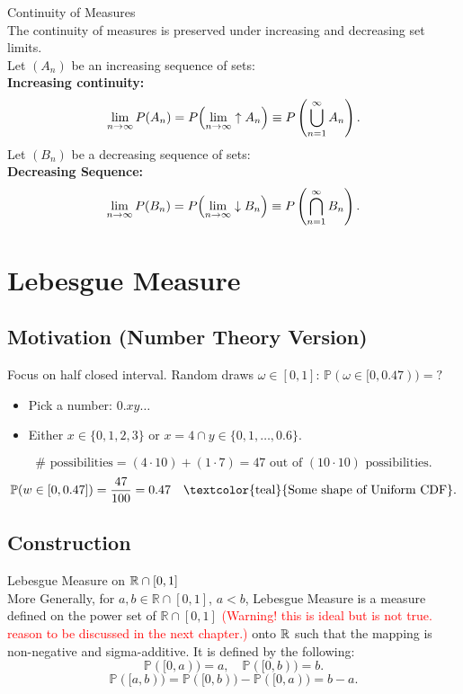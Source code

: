 \begin{prop}{Continuity of Measures}\\
The continuity of measures is preserved under increasing and decreasing set limits. \\

\noindent Let \((A_n)\) be an increasing sequence of sets:\\
\textbf{Increasing continuity:}
    \[
    \lim_{n \to \infty} P(A_n) = P\qty(\lim_{n \to \infty} \uparrow A_n) \equiv P\left(\bigcup_{n=1}^\infty A_n\right).
    \]
 Let \((B_n)\) be a decreasing sequence of sets:\\
 \textbf{Decreasing Sequence:}
    \[
    \lim_{n \to \infty} P(B_n) = P\qty(\lim_{n \to \infty} \downarrow B_n) \equiv P\left(\bigcap_{n=1}^\infty B_n\right).
    \]
\end{prop}

\newpage
\section{Lebesgue Measure}
\subsection{Motivation (Number Theory Version)}
Focus on half closed interval. Random draws $\omega \in [0,1]$: $\mathbb{P}(\omega \in [0,0.47)) = ?$
\begin{itemize}
    \item Pick a number: \(0.xy\ldots\)
    \item Either \(x \in \{0,1,2,3\}\) or \(x = 4 \cap y \in \{0, 1, \ldots, 0.6\}\).
\end{itemize}
\[
\#\text{ possibilities} = (4 \cdot 10) + (1 \cdot 7) = 47 \text{ out of } (10 \cdot 10) \text{ possibilities}.
\]
\[
\mathbb{P}(w \in [0,0.47]) = \frac{47}{100} = 0.47 \quad \text{\textcolor{teal}{Some shape of Uniform CDF}}.
\]

\subsection{Construction}
\begin{df}{Lebesgue Measure on ${\mathbb{R}}\cap [0,1]$}\\
More Generally, for \(a, b \in \mathbb{R} \cap [0,1]\), \(a < b\), Lebesgue Measure is a measure defined on the power set of $\mathbb{R} \cap [0,1]$ \textcolor{red}{(Warning! this is ideal but is not true. reason to be discussed in the next chapter.)} onto ${\mathbb{R}}$ such that the mapping is non-negative and sigma-additive. It is defined by the following: 
\[
\mathbb{P}([0,a)) = a, \quad \mathbb{P}([0,b)) = b.
\]
\[
\mathbb{P}([a,b)) = \mathbb{P}([0,b)) - \mathbb{P}([0,a)) = b - a.
\]
\end{df}

